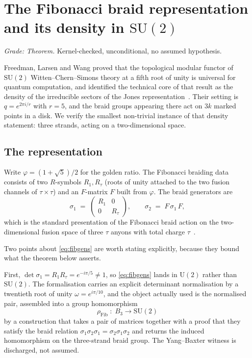 \documentclass[aps,prx,nofootinbib,superscriptaddress,12pt]{revtex4-2}
\begin{document}
\section{The Fibonacci braid representation and its density in $\mathrm{SU}(2)$}
\label{sec:density}

\emph{Grade: Theorem.} Kernel-checked, unconditional, no assumed
hypothesis.

Freedman, Larsen and Wang proved that the topological modular functor
of $\mathrm{SU}(2)$ Witten--Chern--Simons theory at a fifth root of unity
is universal for quantum computation, and identified the technical
core of that result as the density of the irreducible sectors of the
Jones representation~\cite{FreedmanLarsenWang2002}. Their setting is
$q = e^{2\pi i/r}$ with $r=5$, and the braid groups appearing there act
on $3k$ marked points in a disk. We verify the smallest non-trivial
instance of that density statement: three strands, acting on a
two-dimensional space.

\subsection{The representation}

Write $\varphi = (1+\sqrt5)/2$ for the golden ratio. The Fibonacci
braiding data consists of two $R$-symbols $R_1, R_\tau$ (roots of
unity attached to the two fusion channels of $\tau \times \tau$) and
an $F$-matrix $F$ built from $\varphi$. The braid generators are
\begin{equation}
\sigma_1 \;=\;
\begin{pmatrix} R_1 & 0 \\ 0 & R_\tau \end{pmatrix},
\qquad
\sigma_2 \;=\; F\,\sigma_1\,F ,
\label{eq:fibgens}
\end{equation}
which is the standard presentation of the Fibonacci braid action on the
two-dimensional fusion space of three $\tau$ anyons with total charge
$\tau$~\cite{NayakSimonSternFreedmanDasSarma2008}.

Two points about \eqref{eq:fibgens} are worth stating explicitly,
because they bound what the theorem below asserts.

First, $\det \sigma_1 = R_1 R_\tau = e^{-i\pi/5} \neq 1$, so
\eqref{eq:fibgens} lands in $\mathrm{U}(2)$ rather than
$\mathrm{SU}(2)$. The formalisation carries an explicit determinant
normalisation by a twentieth root of unity $\omega = e^{i\pi/10}$, and
the object actually used is the normalised pair, assembled into a group
homomorphism
\[
\rho_{\mathrm{Fib}} \;\colon\; B_3 \longrightarrow \mathrm{SU}(2)
\]
by a construction that takes a pair of matrices together with a proof
that they satisfy the braid relation
$\sigma_1\sigma_2\sigma_1 = \sigma_2\sigma_1\sigma_2$ and returns the
induced homomorphism on the three-strand braid group. The Yang--Baxter
witness is discharged, not assumed.
\end{document}
